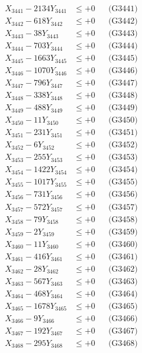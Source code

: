 \documentclass[a4paper,10pt]{article}
\begin{document}
{\begin{align}
\allowbreak
X_{3441} - 2134Y_{3441} &\leq +0 && \text{(G3441)} \\
X_{3442} - 618Y_{3442} &\leq +0 && \text{(G3442)} \\
X_{3443} - 38Y_{3443} &\leq +0 && \text{(G3443)} \\
X_{3444} - 703Y_{3444} &\leq +0 && \text{(G3444)} \\
X_{3445} - 1663Y_{3445} &\leq +0 && \text{(G3445)} \\
X_{3446} - 1070Y_{3446} &\leq +0 && \text{(G3446)} \\
X_{3447} - 796Y_{3447} &\leq +0 && \text{(G3447)} \\
X_{3448} - 338Y_{3448} &\leq +0 && \text{(G3448)} \\
X_{3449} - 488Y_{3449} &\leq +0 && \text{(G3449)} \\
X_{3450} - 11Y_{3450} &\leq +0 && \text{(G3450)} \\
\allowbreak
X_{3451} - 231Y_{3451} &\leq +0 && \text{(G3451)} \\
X_{3452} - 6Y_{3452} &\leq +0 && \text{(G3452)} \\
X_{3453} - 255Y_{3453} &\leq +0 && \text{(G3453)} \\
X_{3454} - 1422Y_{3454} &\leq +0 && \text{(G3454)} \\
X_{3455} - 1017Y_{3455} &\leq +0 && \text{(G3455)} \\
X_{3456} - 731Y_{3456} &\leq +0 && \text{(G3456)} \\
X_{3457} - 572Y_{3457} &\leq +0 && \text{(G3457)} \\
X_{3458} - 79Y_{3458} &\leq +0 && \text{(G3458)} \\
X_{3459} - 2Y_{3459} &\leq +0 && \text{(G3459)} \\
X_{3460} - 11Y_{3460} &\leq +0 && \text{(G3460)} \\
\allowbreak
X_{3461} - 416Y_{3461} &\leq +0 && \text{(G3461)} \\
X_{3462} - 28Y_{3462} &\leq +0 && \text{(G3462)} \\
X_{3463} - 567Y_{3463} &\leq +0 && \text{(G3463)} \\
X_{3464} - 468Y_{3464} &\leq +0 && \text{(G3464)} \\
X_{3465} - 1678Y_{3465} &\leq +0 && \text{(G3465)} \\
X_{3466} - 9Y_{3466} &\leq +0 && \text{(G3466)} \\
X_{3467} - 192Y_{3467} &\leq +0 && \text{(G3467)} \\
X_{3468} - 295Y_{3468} &\leq +0 && \text{(G3468)} \\

\end{align}}
\end{document}
